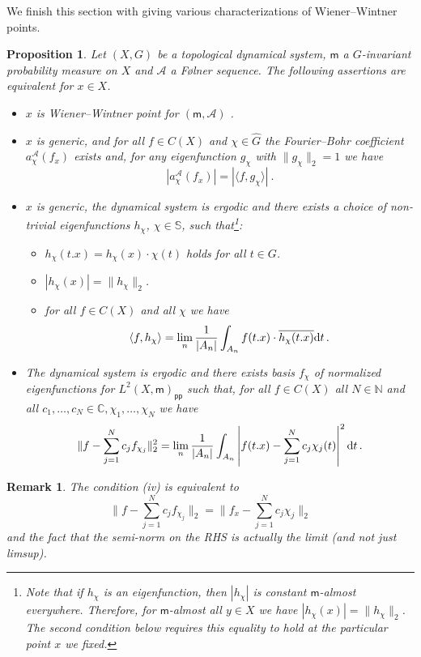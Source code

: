 \documentclass [14pt]{amsart}
\numberwithin{equation}{section}
\newcommand{\CC}{{\mathbb C}}
\newcommand{\NN}{\mathbb N}
\newcommand{\cA}{{\mathcal A}}
\newcommand{\mm}{\mathsf{m}}
\newcommand{\dd}{\mbox{\rm d}}
\newcommand{\SSS}{\mathbb S}
\newtheorem{prop}[theorem]{Proposition}
\newtheorem{remark}[theorem]{Remark}
\begin{document}
We finish this section with giving various characterizations of Wiener--Wintner points.


\begin{prop}\label{sg-char} Let $(X, G)$ be a topological dynamical system, $\mm$ a $G$-invariant probability measure on $X$ and $\cA$ a F\o lner sequence. The following assertions are equivalent for $x \in X$.
\begin{itemize}
  \item[(i)]  $x$ is Wiener--Wintner point for $(\mm, \cA)$ .
  \item[(ii)] $x$ is generic, and for all $f \in C(X)$ and $\chi\in \widehat{G}$ the Fourier--Bohr coefficient $a_\chi^\cA(f_x)$ exists and, for any eigenfunction $g_\chi$ with $\| g_\chi \|_2=1$ we have
  \[
  |a_\chi^\cA(f_x)| = |\langle f, g_\chi \rangle| \ .
  \]

    \item[(iii)] $x$ is generic, the dynamical system is ergodic and there exists a choice of non-trivial eigenfunctions $h_\chi$, $\chi  \in \SSS$,  such that\footnote{Note that if $h_\chi$ is an eigenfunction, then $|h_\chi|$ is constant $\mm$-almost everywhere. Therefore, for $\mm$-almost all $y \in X$ we have $|h_\chi(x)|=\|h_\chi\|_2$. The second condition below requires this equality to hold at the particular point $x$ we fixed.}:
  \begin{itemize}
    \item{} $h_\chi(t.x)=h_\chi(x) \cdot \chi(t)$ holds for all $t \in G$.
    \item{} $|h_\chi(x)|=\|h_\chi\|_2$.
    \item{} for all $f \in C(X)$ and all $\chi$ we have
  \[
  \langle f, h_\chi \rangle = \lim_n \frac{1}{|A_n|} \int_{A_n} f(t.x) \cdot  \overline{h_\chi(t.x)} \dd t \,.
  \]
  \end{itemize}
  \item[(iv)] The dynamical system is ergodic and there exists basis $f_\chi$ of normalized eigenfunctions for $L^2 (X,\mm)_{\mathsf{pp}}$ such that,
   for all $f \in C(X)$ all $N \in \NN$ and all $c_1, \ldots, c_N \in \CC, \chi_1, \ldots , \chi_N$ we have
  \[
\| f- \sum_{j=1}^N c_j f_{\chi_j} \|_2^2 =  \lim_n  \frac{1}{|A_n|} \int_{A_n} \left|f(t.x) - \sum_{j=1}^N c_j \chi_j(t)  \right|^2 \dd t  \,.
  \]
\end{itemize}
\end{prop}
\begin{remark} The condition (iv) is equivalent to
\[
\| f- \sum_{j=1}^N c_j f_{\chi_j} \|_2= \|f_x - \sum_{j=1}^N c_j \chi_j  \|_2
\]
and the fact that the semi-norm on the RHS is actually the limit (and not just limsup).
\end{remark}
\end{document}
